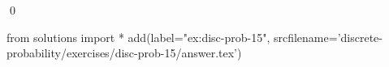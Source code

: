
\begin{ex} 
  \label{ex:disc-prob-15}
  
  \qed
\end{ex} 
\begin{python0}
from solutions import *
add(label="ex:disc-prob-15",
    srcfilename='discrete-probability/exercises/disc-prob-15/answer.tex') 
\end{python0}
